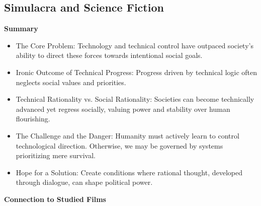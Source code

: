 \documentclass[11pt,fleqn]{book}
\begin{document}
\subsection{Simulacra and Science Fiction}
\textbf{Summary}

\begin{itemize}
\item The Core Problem: Technology and technical control have outpaced society's ability to direct these forces towards intentional social goals.
\item Ironic Outcome of Technical Progress: Progress driven by technical logic often neglects social values and priorities.
\item Technical Rationality vs. Social Rationality:  Societies can become technically advanced yet regress socially, valuing power and stability over human flourishing.
\item The Challenge and the Danger: Humanity must actively learn to control technological direction. Otherwise, we may be governed by systems prioritizing mere survival.
\item Hope for a Solution: Create conditions where rational thought, developed through dialogue, can shape political power. 
\end{itemize}
\vspace{5pt}
\textbf{Connection to Studied Films}
\end{document}
